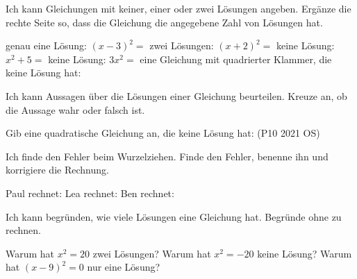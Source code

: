 \begin{aufgabe}{Ich kann Gleichungen mit keiner, einer oder zwei Lösungen angeben.}
Ergänze die rechte Seite so, dass die Gleichung die angegebene Zahl von Lösungen hat.
\begin{teile}
\teil genau eine Lösung: \quad $(x - 3)^2 = {}$ \leerfeld
\teil zwei Lösungen: \quad $(x + 2)^2 = {}$ \leerfeld
\teil keine Lösung: \quad $x^2 + 5 = {}$ \leerfeld
\teil keine Lösung: \quad $3x^2 = {}$ \leerfeld
{}
\teil eine Gleichung mit quadrierter Klammer, die keine Lösung hat: \leerfeld
\end{teile}
\end{aufgabe}

\begin{aufgabe}{Ich kann Aussagen über die Lösungen einer Gleichung beurteilen.}
Kreuze an, ob die Aussage wahr oder falsch ist.
\begin{teile}
\teil {}
\teil Gib eine quadratische Gleichung an, die keine Lösung hat: \leerfeld \hfill (P10 2021 OS)
\end{teile}
\end{aufgabe}

\begin{aufgabe}{Ich finde den Fehler beim Wurzelziehen.}
Finde den Fehler, benenne ihn und korrigiere die Rechnung.
\begin{teile}
\teil Paul rechnet: 
\teil Lea rechnet: 
\teil Ben rechnet: 
\end{teile}
\end{aufgabe}

\begin{aufgabe}{Ich kann begründen, wie viele Lösungen eine Gleichung hat.}
Begründe ohne zu rechnen.
\begin{teile}
\teil Warum hat $x^2 = 20$ zwei Lösungen?
\teil Warum hat $x^2 = -20$ keine Lösung?
\teil Warum hat $(x - 9)^2 = 0$ nur eine Lösung?
\end{teile}
\end{aufgabe}

